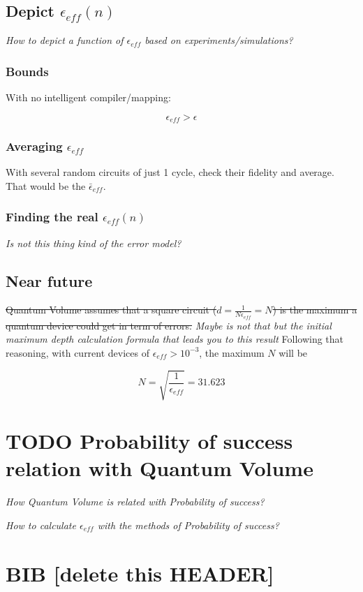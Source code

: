 \documentclass[11pt]{article}
\begin{document}
\subsection{Depict \(\epsilon_{eff}(n)\)}
\label{sec:org3660794}

\emph{How to depict a function of \(\epsilon_{eff}\) based on experiments/simulations?}

\subsubsection{Bounds}
\label{sec:org4c2ca3b}

With no intelligent compiler/mapping:

$$\epsilon_{eff} > \epsilon$$

\subsubsection{Averaging \(\epsilon_{eff}\)}
\label{sec:org52189c3}

With several random circuits of just 1 cycle, check their fidelity and average. That would be the \(\bar{\epsilon}_{eff}\).

\subsubsection{Finding the real \(\epsilon_{eff} (n)\)}
\label{sec:org50da1c3}

\emph{Is not this thing kind of the error model?}

\subsection{Near future}
\label{sec:org8f224b7}

\sout{Quantum Volume assumes that a square circuit (\(d = \frac{1}{N \epsilon_{eff}} = N\)) is the maximum a quantum device could get in term of errors.}
\emph{Maybe is not that but the initial maximum depth calculation formula that leads you to this result}
Following that reasoning, with current devices of \(\epsilon_{eff} > 10^{-3}\), the maximum \(N\) will be

$$N = \sqrt{\frac{1}{\epsilon_{eff}}} = 31.623$$


\section{{\bfseries\sffamily TODO} Probability of success relation with Quantum Volume}
\label{sec:org54f6209}

\emph{How Quantum Volume is related with Probability of success?}

\emph{How to calculate \(\epsilon_{eff}\) with the methods of Probability of success?}



\section{BIB [delete this HEADER]}
\label{sec:org3583141}



\end{document}
